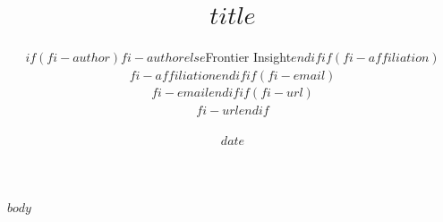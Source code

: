 \documentclass[11pt,a4paper]{article}
\title{\Huge\bfseries $title$}
\author{$if(fi-author)$$fi-author$$else$Frontier Insight$endif$$if(fi-affiliation)$\\{\small $fi-affiliation$}$endif$$if(fi-email)$\\{\small $fi-email$}$endif$$if(fi-url)$\\{\small $fi-url$}$endif$}
\date{$date$}
\begin{document}
\begin{titlepage}
  \maketitle
  \thispagestyle{empty}
\end{titlepage}

\tableofcontents
\clearpage

$body$
\end{document}
